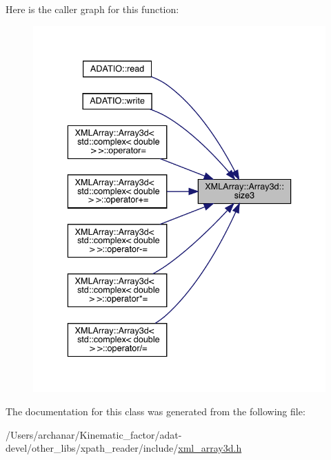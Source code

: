 Here is the caller graph for this function\+:
\nopagebreak
\begin{figure}[H]
\begin{center}
\leavevmode
\includegraphics[width=336pt]{db/da0/classXMLArray_1_1Array3d_acd75aac75b08156dddab9c76dd3ebf33_icgraph}
\end{center}
\end{figure}


The documentation for this class was generated from the following file\+:\begin{DoxyCompactItemize}
\item 
/\+Users/archanar/\+Kinematic\+\_\+factor/adat-\/devel/other\+\_\+libs/xpath\+\_\+reader/include/\mbox{\hyperlink{adat-devel_2other__libs_2xpath__reader_2include_2xml__array3d_8h}{xml\+\_\+array3d.\+h}}\end{DoxyCompactItemize}
